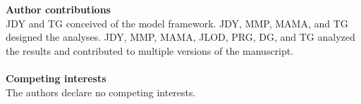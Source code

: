 \documentclass[twocolumn,preprintnumbers,amsmath,amssymb,superscriptaddress,linenumbers]{revtex4-1}
\begin{document}
\noindent \textbf{Author contributions}\\
  \footnotesize{
  JDY and TG conceived of the model framework. JDY, MMP, MAMA, and TG designed the analyses. JDY, MMP, MAMA, JLOD, PRG, DG, and TG analyzed the results and contributed to multiple versions of the manuscript.
  }\\ \\
\noindent \textbf{Competing interests}\\
  \footnotesize{
  The authors declare no competing interests.
  }
\clearpage

\clearpage
\end{document}
